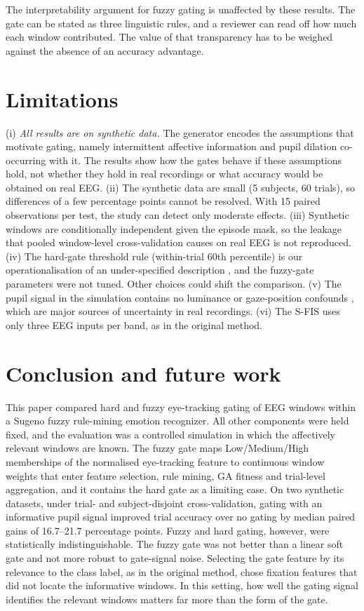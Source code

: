 The interpretability argument for fuzzy gating is unaffected by these results. The gate can be stated as three linguistic rules, and a reviewer can read off how much each window contributed. The value of that transparency has to be weighed against the absence of an accuracy advantage.

\section{Limitations}
\label{sec:limits}
(i) \emph{All results are on synthetic data.} The generator encodes the assumptions that motivate gating, namely intermittent affective information and pupil dilation co-occurring with it. The results show how the gates behave if these assumptions hold, not whether they hold in real recordings or what accuracy would be obtained on real EEG. (ii) The synthetic data are small (5 subjects, 60 trials), so differences of a few percentage points cannot be resolved. With 15 paired observations per test, the study can detect only moderate effects. (iii) Synthetic windows are conditionally independent given the episode mask, so the leakage that pooled window-level cross-validation causes on real EEG is not reproduced. (iv) The hard-gate threshold rule (within-trial 60th percentile) is our operationalisation of an under-specified description \cite{FarhadiSedehi2024a}, and the fuzzy-gate parameters were not tuned. Other choices could shift the comparison. (v) The pupil signal in the simulation contains no luminance or gaze-position confounds \cite{Mathot2018,Raiturkar2016}, which are major sources of uncertainty in real recordings. (vi) The S-FIS uses only three EEG inputs per band, as in the original method.

\section{Conclusion and future work}
\label{sec:conclusion}
This paper compared hard and fuzzy eye-tracking gating of EEG windows within a Sugeno fuzzy rule-mining emotion recognizer. All other components were held fixed, and the evaluation was a controlled simulation in which the affectively relevant windows are known. The fuzzy gate maps Low/Medium/High memberships of the normalised eye-tracking feature to continuous window weights that enter feature selection, rule mining, GA fitness and trial-level aggregation, and it contains the hard gate as a limiting case. On two synthetic datasets, under trial- and subject-disjoint cross-validation, gating with an informative pupil signal improved trial accuracy over no gating by median paired gains of 16.7--21.7 percentage points. Fuzzy and hard gating, however, were statistically indistinguishable. The fuzzy gate was not better than a linear soft gate and not more robust to gate-signal noise. Selecting the gate feature by its relevance to the class label, as in the original method, chose fixation features that did not locate the informative windows. In this setting, how well the gating signal identifies the relevant windows matters far more than the form of the gate.

